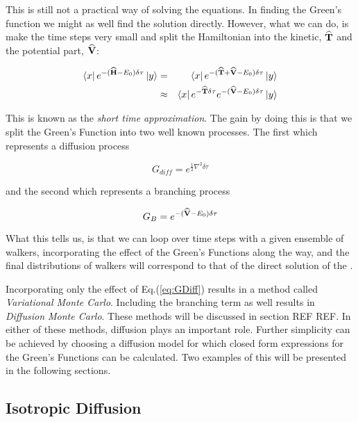 This is still not a practical way of solving the equations. In finding the Green's function we might as well find the solution directly. However, what we can do, is make the time steps very small and split the Hamiltonian into the kinetic, ${\bf\widehat{T}}$ and the potential part, ${\bf\widehat{V}}$:

\begin{eqnarray}
 \left< x \right|e^{-({\bf\widehat{H}} - E_0)\delta\tau}\left| y \right> &=& \left< x \right|e^{-({\bf\widehat{T}} + {\bf\widehat{V}} - E_0)\delta\tau}\left| y \right> \nonumber \\
                                             &\approx& \left< x \right|e^{-{\bf\widehat{T}}\delta\tau}e^{-({\bf\widehat{V}} - E_0)\delta\tau}\left| y \right>
\end{eqnarray}

This is known as the \textit{short time approximation}. The gain by doing this is that we split the Green's Function into two well known processes. The first which represents a diffusion process

\begin{equation}
 G_{diff} = e^{\frac{1}{2}\nabla^2\delta\tau}
\label{eq:GDiff}
\end{equation}

and the second which represents a branching process

\begin{equation}
 G_{B} = e^{-({\bf\widehat{V}} - E_0)\delta\tau}
 \label{eq:GB}
\end{equation}

What this tells us, is that we can loop over time steps with a given ensemble of walkers, incorporating the effect of the Green's Functions along the way, and the final distributions of walkers will correspond to that of the direct solution of the \schrodinger. 

Incorporating only the effect of Eq.(\ref{eq:GDiff}) results in a method called \textit{Variational Monte Carlo}. Including the branching term as well results in \textit{Diffusion Monte Carlo}. These methods will be discussed in section REF REF. In either of these methods, diffusion plays an important role. Further simplicity can be achieved by choosing a diffusion model for which closed form expressions for the Green's Functions can be calculated. Two examples of this will be presented in the following sections.



\subsection{Isotropic Diffusion}

